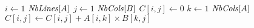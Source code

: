 \begin{codebox}
\li \For $i \gets 1$ \To $\id{NbLines}[A]$
\li \Do
      \For $j \gets 1$ \To $\id{NbCols}[B]$
\li   \Do
        $C[i,j] \gets 0$
\li     \For $k \gets 1$ \To $\id{NbCols}[A]$
\li     \Do
        $C[i,j] \gets C[i,j] + A[i, k] \times B[k, j]$
        \End    
      \End    
    \End    
\end{codebox}

